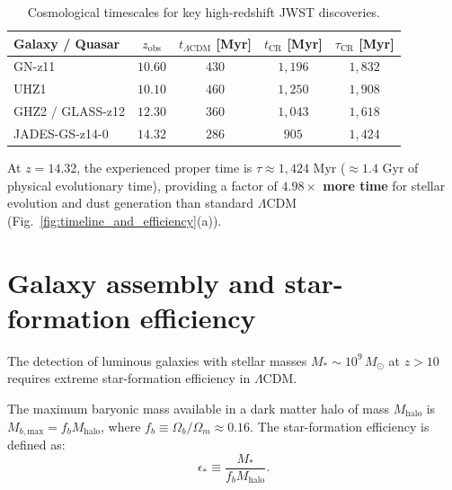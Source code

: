 \documentclass[aps,prd,reprint,superscriptaddress,nofootinbib,floatfix,amsmath,amssymb]{revtex4-2}
\begin{document}
\begin{table}[h]
\caption{Cosmological timescales for key high-redshift JWST discoveries.}
\label{tab:comparison_jades}
\begin{ruledtabular}
\footnotesize
\setlength{\tabcolsep}{2.5pt}
\begin{tabular}{lcccc}
Galaxy / Quasar & $z_{\text{obs}}$ & $t_{\Lambda\text{CDM}}$ [Myr] & $t_{\text{CR}}$ [Myr] & $\tau_{\text{CR}}$ [Myr] \\
\hline
GN-z11 & $10.60$ & $430$ & $1,196$ & $1,832$ \\
UHZ1 & $10.10$ & $460$ & $1,250$ & $1,908$ \\
GHZ2 / GLASS-z12 & $12.30$ & $360$ & $1,043$ & $1,618$ \\
JADES-GS-z14-0 & $14.32$ & $286$ & $905$ & $1,424$ \\
\end{tabular}
\end{ruledtabular}
\end{table}

At $z = 14.32$, the experienced proper time is $\tau \approx 1,424\text{ Myr}$ ($\approx 1.4\text{ Gyr}$ of physical evolutionary time), providing a factor of \textbf{$4.98\times$ more time} for stellar evolution and dust generation than standard $\Lambda\text{CDM}$ (Fig.~\ref{fig:timeline_and_efficiency}(a)).

\section{Galaxy assembly and star-formation efficiency}
\label{sec:star_formation}

The detection of luminous galaxies with stellar masses $M_* \sim 10^9\,M_\odot$ at $z > 10$ requires extreme star-formation efficiency in $\Lambda\text{CDM}$.

The maximum baryonic mass available in a dark matter halo of mass $M_{\text{halo}}$ is $M_{b,\text{max}} = f_b M_{\text{halo}}$, where $f_b \equiv \Omega_b/\Omega_m \approx 0.16$. The star-formation efficiency is defined as:
\begin{equation}
\epsilon_* \equiv \frac{M_*}{f_b M_{\text{halo}}}.
\label{eq:efficiency_def}
\end{equation}
\end{document}
